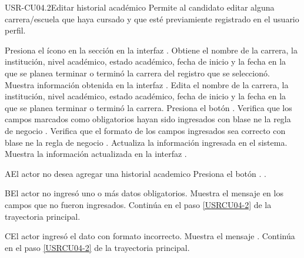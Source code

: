 \begin{UseCase}[]{USR-CU04.2}{Editar historial académico}{
	Permite al candidato editar alguna carrera/escuela  que haya cursado y que esté previamiente registrado en el usuario perfil.
}
\end{UseCase}

\begin{UCtrayectoria}
	\UCpaso [\UCactor] Presiona el ícono \IUEditar{} en la sección en la interfaz .
	\UCpaso Obtiene el nombre de la carrera, la institución, nivel académico, estado académico, fecha de inicio y la fecha en la que se planea terminar o terminó la carrera del registro que se seleccionó.
	\UCpaso Muestra información obtenida en la interfaz .
	\UCpaso [\UCsist] \label{USRCU04-2} Edita el nombre de la carrera, la institución, nivel académico, estado académico, fecha de inicio y la fecha en la que se planea terminar o terminó la carrera.
	\UCpaso [\UCsist] Presiona el botón .
	\UCpaso Verifica que los campos marcados como obligatorios hayan sido ingresados con blase ne la regla de negocio .
	\UCpaso Verifica que el formato de los campos ingresados sea correcto con blase ne la regla de negocio .
	\UCpaso Actualiza la información ingresada en el sistema.
	\UCpaso Muestra la información actualizada en la interfaz . 
\end{UCtrayectoria}

\begin{UCtrayectoriaA}{A}{El actor no desea agregar una historial academico}
	\UCpaso [\UCsist] Presiona el botón .
	.
\end{UCtrayectoriaA} 

\begin{UCtrayectoriaA}{B}{El actor no ingresó uno o más datos obligatorios.}
	\UCpaso [\UCsist] Muestra el mensaje  en los campos que no fueron ingresados.
	\UCpaso [\UCsist] Continúa en el paso \ref{USRCU04-2} de la trayectoria principal.
\end{UCtrayectoriaA} 

\begin{UCtrayectoriaA}{C}{El actor ingresó el dato con formato incorrecto.}
	\UCpaso [\UCsist] Muestra el mensaje .
	\UCpaso [\UCsist] Continúa en el paso \ref{USRCU04-2} de la trayectoria principal.
\end{UCtrayectoriaA}



